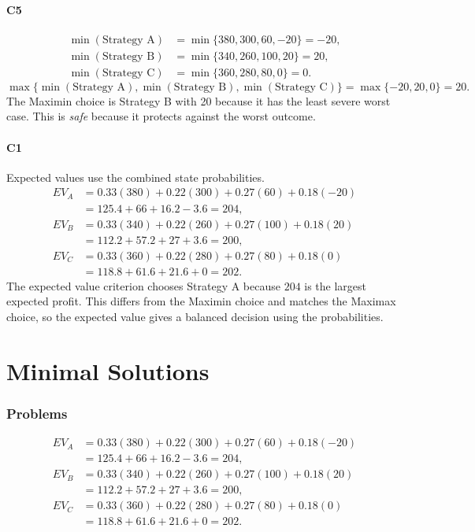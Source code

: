 \begin{ExamProblems}
		\subsection*{C5}
		\[
		\begin{aligned}
		\min(\text{Strategy A}) &= \min\{380,300,60,-20\} = -20,\\
		\min(\text{Strategy B}) &= \min\{340,260,100,20\} = 20,\\
		\min(\text{Strategy C}) &= \min\{360,280,80,0\} = 0.
		\end{aligned}
		\]
		\[
		\max\{\min(\text{Strategy A}), \min(\text{Strategy B}), \min(\text{Strategy C})\}
		= \max\{-20, 20, 0\}
		= 20.
		\]
		The Maximin choice is Strategy B with 20 because it has the least severe worst case. This is \emph{safe} because it protects against the worst outcome.

		\subsection*{C1}
		Expected values use the combined state probabilities.
		\[
		\begin{aligned}
		EV_A &= 0.33(380)+0.22(300)+0.27(60)+0.18(-20)\\
		&= 125.4+66+16.2-3.6=204,\\
		EV_B &= 0.33(340)+0.22(260)+0.27(100)+0.18(20)\\
		&= 112.2+57.2+27+3.6=200,\\
		EV_C &= 0.33(360)+0.22(280)+0.27(80)+0.18(0)\\
		&= 118.8+61.6+21.6+0=202.
		\end{aligned}
		\]
		The expected value criterion chooses Strategy A because $204$ is the largest expected profit. This differs from the Maximin choice and matches the Maximax choice, so the expected value gives a balanced decision using the probabilities.
	\end{ExamProblems}


\part{Minimal Solutions}

\section*{Problems}
\[\begin{aligned}
		EV_A &= 0.33(380)+0.22(300)+0.27(60)+0.18(-20)\\
		&= 125.4+66+16.2-3.6=204,\\
		EV_B &= 0.33(340)+0.22(260)+0.27(100)+0.18(20)\\
		&= 112.2+57.2+27+3.6=200,\\
		EV_C &= 0.33(360)+0.22(280)+0.27(80)+0.18(0)\\
		&= 118.8+61.6+21.6+0=202.
		\end{aligned}\]


